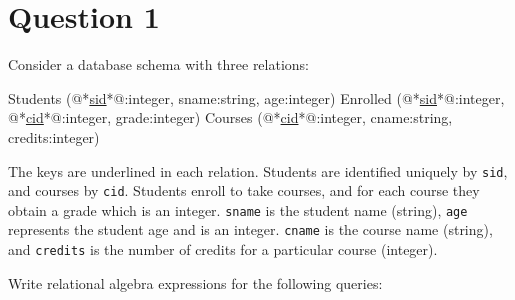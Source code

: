 
\section*{Question 1}

Consider a database schema with three relations:

\begin{terminal}
Students (@*\underline{sid}*@:integer, sname:string, age:integer)
Enrolled (@*\underline{sid}*@:integer, @*\underline{cid}*@:integer, grade:integer)
Courses  (@*\underline{cid}*@:integer, cname:string, credits:integer)
\end{terminal}

The keys are underlined in each relation.
Students are identified uniquely by \texttt{sid}, and courses by \texttt{cid}.
Students enroll to take courses, and for each course they obtain a grade which is an integer.
\texttt{sname} is the student name (string), \texttt{age} represents the student age and is an integer.
\texttt{cname} is the course name (string), and \texttt{credits} is the number of credits for a particular course (integer).

Write relational algebra expressions for the following queries:

